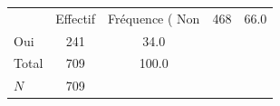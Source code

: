 {
\def\sym#1{\ifmmode^{#1}\else\(^{#1}\)\fi}
\begin{tabular}{l*{1}{cc}}
\toprule
            &    Effectif&Fréquence (%
\midrule
Non         &         468&        66.0\\
Oui         &         241&        34.0\\
Total       &         709&       100.0\\
\midrule
\(N\)       &         709&            \\
\bottomrule
\end{tabular}
}
